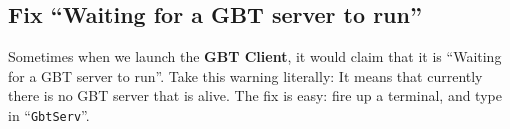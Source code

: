 \subsection{Fix ``Waiting for a GBT server to run''}
Sometimes when we launch the \textbf{GBT Client}, it would claim that it is
``Waiting for a GBT server to run''.
Take this warning literally: It means that currently there is no GBT server that
is alive.
The fix is easy: fire up a terminal, and type in ``\texttt{GbtServ}''.
